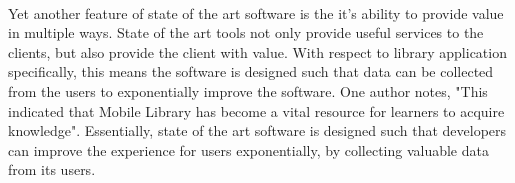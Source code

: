     \paragraph{}
    Yet another feature of state of the art software is the it's ability to provide value in multiple ways. State of the art tools not only provide useful services to the clients, but also provide the client with value. With respect to library application specifically, this means the software is designed such that data can be collected from the users to exponentially improve the software. One author notes, "This indicated that Mobile Library has become a vital resource for learners to acquire knowledge"\cite{given_one}.  Essentially, state of the art software is designed such that developers can improve the experience for users exponentially, by collecting valuable data from its users.  
    
    
    
